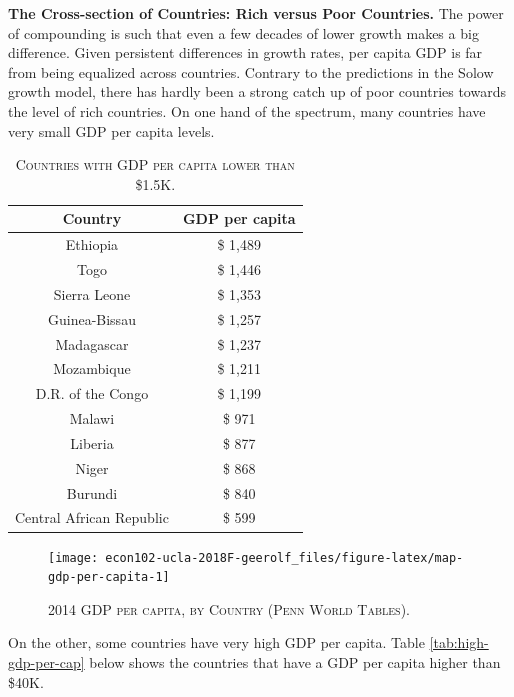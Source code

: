 \documentclass[]{book}
\theoremstyle{definition}
\theoremstyle{definition}
\theoremstyle{definition}
\theoremstyle{remark}
\begin{document}
\textbf{The Cross-section of Countries: Rich versus Poor Countries.} The
power of compounding is such that even a few decades of lower growth
makes a big difference. Given persistent differences in growth rates,
per capita GDP is far from being equalized across countries. Contrary to
the predictions in the Solow growth model, there has hardly been a
strong catch up of poor countries towards the level of rich countries.
On one hand of the spectrum, many countries have very small GDP per
capita levels.




\begin{table}

\caption{\label{tab:low-gdp-per-cap}\textsc{Countries with GDP per capita lower than
\$1.5K.}}
\centering
\begin{tabular}[t]{cc}
\toprule
Country & GDP per capita\\
\midrule
Ethiopia & \$ 1,489\\
Togo & \$ 1,446\\
Sierra Leone & \$ 1,353\\
Guinea-Bissau & \$ 1,257\\
Madagascar & \$ 1,237\\
\addlinespace
Mozambique & \$ 1,211\\
D.R. of the Congo & \$ 1,199\\
Malawi & \$ 971\\
Liberia & \$ 877\\
Niger & \$ 868\\
\addlinespace
Burundi & \$ 840\\
Central African Republic & \$ 599\\
\bottomrule
\end{tabular}
\end{table}




\begin{figure}

{\centering \texttt{[image: econ102-ucla-2018F-geerolf\_files/figure-latex/map-gdp-per-capita-1]} 

}

\caption{\textsc{2014 GDP per capita, by Country (Penn
World Tables)}.}\label{fig:map-gdp-per-capita}
\end{figure}

On the other, some countries have very high GDP per capita. Table
\ref{tab:high-gdp-per-cap} below shows the countries that have a GDP per
capita higher than \$40K.
\end{document}
